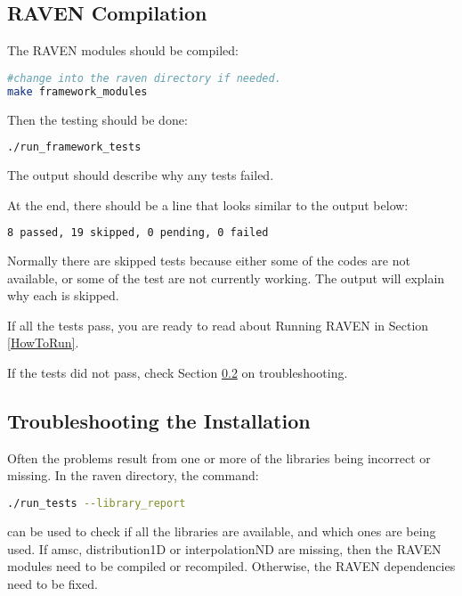 \subsection{RAVEN Compilation}
\label{raven_compilation}

The RAVEN modules should be compiled:

\begin{lstlisting}[language=bash]
#change into the raven directory if needed.
make framework_modules
\end{lstlisting}

Then the testing should be done:

\begin{lstlisting}[language=bash]
./run_framework_tests
\end{lstlisting}

The output should describe why any tests failed.

At the end, there should be a line that looks similar to the output below:
\begin{lstlisting}[language=bash]
8 passed, 19 skipped, 0 pending, 0 failed
\end{lstlisting}

Normally there are skipped tests because either some of the codes are
not available, or some of the test are not currently working.  The
output will explain why each is skipped.

If all the tests pass, you are ready to read about Running RAVEN in
Section \ref{HowToRun}.

If the tests did not pass, check Section
\ref{troubleshooting_installation} on troubleshooting.

\subsection{Troubleshooting the Installation}
\label{troubleshooting_installation}

Often the problems result from one or more of the libraries being
incorrect or missing.  In the raven directory, the command:

\begin{lstlisting}[language=bash]
./run_tests --library_report
\end{lstlisting}
can be used to check if all the libraries are available, and which
ones are being used.  If amsc, distribution1D or interpolationND are
missing, then the RAVEN modules need to be compiled or recompiled.
Otherwise, the RAVEN dependencies need to be fixed.

